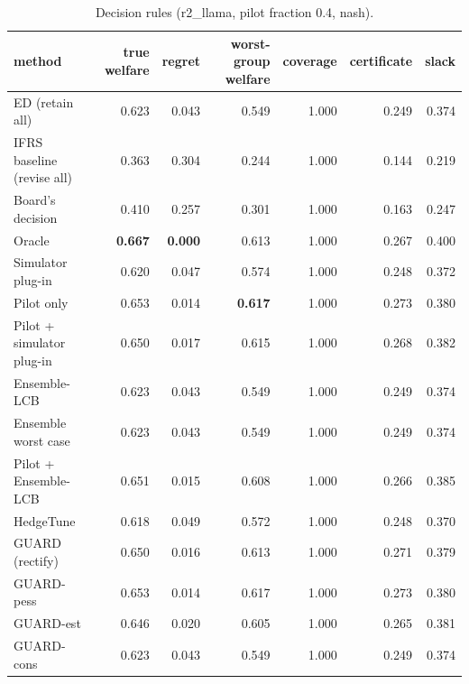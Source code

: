 \begin{table}[t]
\centering
\small
\begin{tabular}{lrrrrrr}
\toprule
method & true welfare & regret & worst-group welfare & coverage & certificate & slack \\
\midrule
ED (retain all) & 0.623 & 0.043 & 0.549 & 1.000 & 0.249 & 0.374 \\
IFRS baseline (revise all) & 0.363 & 0.304 & 0.244 & 1.000 & 0.144 & 0.219 \\
Board's decision & 0.410 & 0.257 & 0.301 & 1.000 & 0.163 & 0.247 \\
Oracle & \textbf{0.667} & \textbf{0.000} & 0.613 & 1.000 & 0.267 & 0.400 \\
Simulator plug-in & 0.620 & 0.047 & 0.574 & 1.000 & 0.248 & 0.372 \\
Pilot only & 0.653 & 0.014 & \textbf{0.617} & 1.000 & 0.273 & 0.380 \\
Pilot + simulator plug-in & 0.650 & 0.017 & 0.615 & 1.000 & 0.268 & 0.382 \\
Ensemble-LCB & 0.623 & 0.043 & 0.549 & 1.000 & 0.249 & 0.374 \\
Ensemble worst case & 0.623 & 0.043 & 0.549 & 1.000 & 0.249 & 0.374 \\
Pilot + Ensemble-LCB & 0.651 & 0.015 & 0.608 & 1.000 & 0.266 & 0.385 \\
HedgeTune & 0.618 & 0.049 & 0.572 & 1.000 & 0.248 & 0.370 \\
GUARD (rectify) & 0.650 & 0.016 & 0.613 & 1.000 & 0.271 & 0.379 \\
GUARD-pess & 0.653 & 0.014 & 0.617 & 1.000 & 0.273 & 0.380 \\
GUARD-est & 0.646 & 0.020 & 0.605 & 1.000 & 0.265 & 0.381 \\
GUARD-cons & 0.623 & 0.043 & 0.549 & 1.000 & 0.249 & 0.374 \\
\bottomrule
\end{tabular}
\caption{Decision rules (r2\_llama, pilot fraction 0.4, nash).}
\label{tab:methods-nash}
\end{table}
